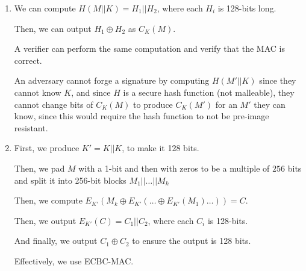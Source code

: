 \begin{enumerate}[label=(\alph*)]
\begin{enumerate}[label=(\roman*)]
          \item
            We can compute $H(M||K) = H_1||H_2$, where each $H_i$ is 128-bits long.

            Then, we can output $H_1 \oplus H_2$ as $C_K(M)$.

            A verifier can perform the same computation and verify that the MAC is correct.

            An adversary cannot forge a signature by computing $H(M'||K)$ since they cannot know $K$, and since $H$ is a secure hash function (not malleable), they cannot change bits of $C_K(M)$ to produce $C_K(M')$ for an $M'$ they can know, since this would require the hash function to not be pre-image resistant.

            \item
              First, we produce $K' = K||K$, to make it 128 bits.

              Then, we pad $M$ with a 1-bit and then with zeros to be a multiple of $256$ bits and split it into 256-bit blocks $M_1||\ldots||M_k$

              Then, we compute $E_{K'}(M_k \oplus E_{K'}(\ldots \oplus E_{K'}(M_1)\ldots)) = C$.

              Then, we output $E_{K'}(C) = C_1||C_2$, where each $C_i$ is 128-bits.

              And finally, we output $C_1 \oplus C_2$ to ensure the output is 128 bits.

              Effectively, we use ECBC-MAC.


            
        \end{enumerate}



        
    \end{enumerate}

